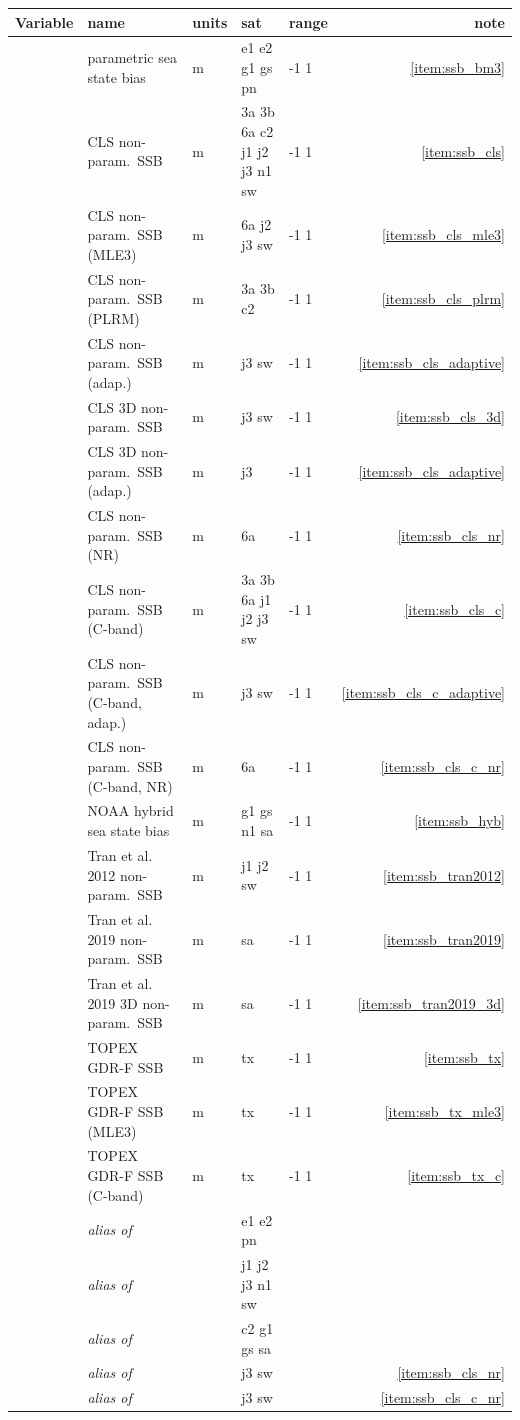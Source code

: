 \documentclass[a4paper,11pt,openany,natbib,nomargin]{thesis}
\newcommand\alias[1]{\emph{alias of} \var{#1}}
\newenvironment{vartable}{
\begin{table}[ht]
\small
\begin{tabular}{lllllr}
\hline\hline
Variable & name & units & sat & range & note \\
\hline\hline
}{
\hline
\end{tabular}
\end{table}
}
\begin{document}
\begin{vartable}
\var{ssb_bm3} & parametric sea state bias & m & e1 e2 g1 gs pn & -1 1 & \ref{item:ssb_bm3} \\
\var{ssb_cls} & CLS non-param.\ SSB & m & 3a 3b 6a c2 j1 j2 j3 n1 sw & -1 1 & \ref{item:ssb_cls} \\
\var{ssb_cls_mle3} & CLS non-param.\ SSB (MLE3) & m & 6a j2 j3 sw & -1 1 & \ref{item:ssb_cls_mle3} \\
\var{ssb_cls_plrm} & CLS non-param.\ SSB (PLRM) & m & 3a 3b c2 & -1 1 & \ref{item:ssb_cls_plrm} \\
\var{ssb_cls_adaptive} & CLS non-param.\ SSB (adap.) & m & j3 sw & -1 1 & \ref{item:ssb_cls_adaptive} \\
\var{ssb_cls_3d} & CLS 3D non-param.\ SSB & m & j3 sw & -1 1 & \ref{item:ssb_cls_3d} \\
\var{ssb_cls_3d_adaptive} & CLS 3D non-param.\ SSB (adap.) & m & j3 & -1 1 & \ref{item:ssb_cls_adaptive} \\
\var{ssb_cls_nr} & CLS non-param.\ SSB (NR) & m & 6a & -1 1 & \ref{item:ssb_cls_nr} \\
\var{ssb_cls_c} & CLS non-param.\ SSB (C-band) & m & 3a 3b 6a j1 j2 j3 sw & -1 1 & \ref{item:ssb_cls_c} \\
\var{ssb_cls_c_adaptive} & CLS non-param.\ SSB (C-band, adap.) & m & j3 sw & -1 1 & \ref{item:ssb_cls_c_adaptive} \\
\var{ssb_cls_c_nr} & CLS non-param.\ SSB (C-band, NR) & m & 6a & -1 1 & \ref{item:ssb_cls_c_nr} \\
\var{ssb_hyb} & NOAA hybrid sea state bias & m & g1 gs n1 sa & -1 1 & \ref{item:ssb_hyb} \\
\var{ssb_tran2012} & Tran et al. 2012 non-param.\ SSB & m & j1 j2 sw & -1 1 & \ref{item:ssb_tran2012} \\
\var{ssb_tran2019} & Tran et al. 2019 non-param.\ SSB & m & sa & -1 1 & \ref{item:ssb_tran2019} \\
\var{ssb_tran2019_3d} & Tran et al. 2019 3D non-param.\ SSB & m & sa & -1 1 & \ref{item:ssb_tran2019_3d} \\
\var{ssb_tx}  & TOPEX GDR-F SSB & m & tx & -1 1 & \ref{item:ssb_tx} \\
\var{ssb_tx_mle3}  & TOPEX GDR-F SSB (MLE3) & m & tx & -1 1 & \ref{item:ssb_tx_mle3} \\
\var{ssb_tx_c}  & TOPEX GDR-F SSB (C-band) & m & tx & -1 1 & \ref{item:ssb_tx_c} \\
\hline
\var{ssb}     & \alias{ssb_bm3} && e1 e2 pn && \\
\var{ssb}     & \alias{ssb_cls} && j1 j2 j3 n1 sw && \\
\var{ssb}     & \alias{ssb_hyb} && c2 g1 gs sa && \\
\var{ssb_cls_nr} & \alias{ssb_cls_adaptive} && j3 sw && \ref{item:ssb_cls_nr} \\
\var{ssb_cls_c_nr} & \alias{ssb_cls_c_adaptive} && j3 sw && \ref{item:ssb_cls_c_nr} \\
\end{vartable}
\end{document}
